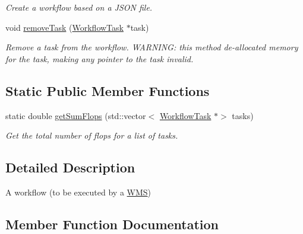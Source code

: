 \begin{DoxyCompactItemize}
\begin{DoxyCompactList}\small\item\em Create a workflow based on a J\+S\+ON file. \end{DoxyCompactList}\item 
void \hyperlink{classwrench_1_1_workflow_af2361b641261ea13079902bef91e11f4}{remove\+Task} (\hyperlink{classwrench_1_1_workflow_task}{Workflow\+Task} $\ast$task)
\begin{DoxyCompactList}\small\item\em Remove a task from the workflow. W\+A\+R\+N\+I\+NG\+: this method de-\/allocated memory for the task, making any pointer to the task invalid. \end{DoxyCompactList}\end{DoxyCompactItemize}
\subsection*{Static Public Member Functions}
\begin{DoxyCompactItemize}
\item 
static double \hyperlink{classwrench_1_1_workflow_a2d6acb74faf1153f491bf7b52847ce82}{get\+Sum\+Flops} (std\+::vector$<$ \hyperlink{classwrench_1_1_workflow_task}{Workflow\+Task} $\ast$$>$ tasks)
\begin{DoxyCompactList}\small\item\em Get the total number of flops for a list of tasks. \end{DoxyCompactList}\end{DoxyCompactItemize}


\subsection{Detailed Description}
A workflow (to be executed by a \hyperlink{classwrench_1_1_w_m_s}{W\+MS}) 

\subsection{Member Function Documentation}
\mbox{\label{classwrench_1_1_workflow_a1249e2430c541344d622d75519e4851b}} 

